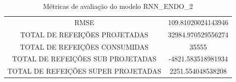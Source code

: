 \documentclass[	12pt, Times, openright, twoside, a4paper, english, brazil]{abntex2}
\begin{document}
        {\begin{center} \begin{minipage}[c]{0.45\textwidth}
                \begin{figure}[H]
                \end{figure}\end{minipage} \hfill %
                      \begin{minipage}[c]{1.0\textwidth}
                \begin{figure}[H]
                \end{figure}
                 \end{minipage} \end{center} }
                
                   \begin{table}[!ht]
                   \centering
                   \caption{Métricas de avaliação do modelo RNN\_ENDO\_2 }
                    \begin{tabular}{|c|c|}
                    \rowcolor{gray!50}
                    \hline
                \multicolumn{2}{c}{METRICAS DO MODELO RNN\_ENDO\_2 :}  \\ \hline
                RMSE & 109.81020024143946\\
                TOTAL DE REFEIÇÕES PROJETADAS & 32984.970529556274\\
                TOTAL DE REFEIÇÕES CONSUMIDAS & 35555\\
                TOTAL DE REFEIÇÕES SUB PROJETADAS & -4821.583518981934\\
                TOTAL DE REFEIÇÕES SUPER PROJETADAS & 2251.554048538208\\
                \hline \end{tabular} \end{table}
                
\end{document}
